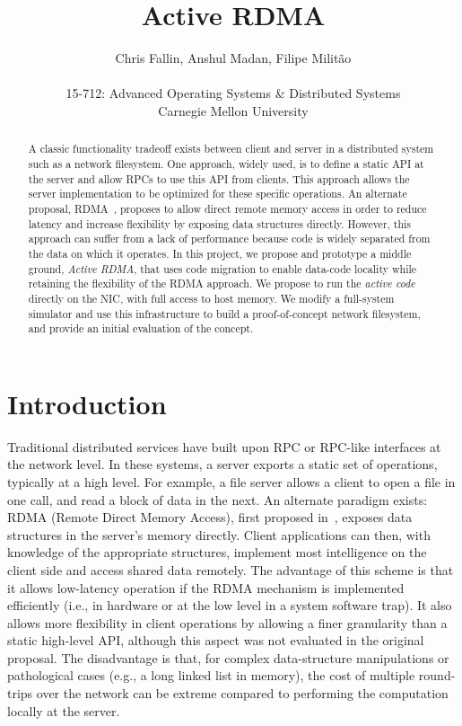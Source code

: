 \documentclass[10pt]{article}
\title{Active RDMA}
\author{Chris Fallin, Anshul Madan, Filipe Milit\~{a}o\\ \\
15-712: Advanced Operating Systems \&  Distributed Systems\\
Carnegie Mellon University}
\date{}
\begin{document}
\maketitle

\begin{abstract}
A classic functionality tradeoff exists between client and server in a
distributed system such as a network filesystem. One approach, widely
used, is to define a static API at the server and allow RPCs to use
this API from clients. This approach allows the server implementation
to be optimized for these specific operations. An alternate proposal,
RDMA~\cite{thekkath94}, proposes to allow direct remote memory access
in order to reduce latency and increase flexibility by exposing data
structures directly. However, this approach can suffer from a lack of
performance because code is widely separated from the data on which it
operates. In this project, we propose and prototype a middle ground,
\emph{Active RDMA}, that uses code migration to enable data-code
locality while retaining the flexibility of the RDMA approach. We
propose to run the \emph{active code} directly on the NIC, with full
access to host memory. We modify a full-system simulator and use this
infrastructure to build a proof-of-concept network filesystem, and
provide an initial evaluation of the concept.

\end{abstract}

\section{Introduction}

Traditional distributed services have built upon RPC or RPC-like
interfaces at the network level. In these systems, a server exports a
static set of operations, typically at a high level. For example, a
file server allows a client to open a file in one call, and read a
block of data in the next. An alternate paradigm exists: RDMA (Remote
Direct Memory Access), first proposed in~\cite{thekkath94}, exposes
data structures in the server's memory directly. Client applications
can then, with knowledge of the appropriate structures, implement most
intelligence on the client side and access shared data remotely. The
advantage of this scheme is that it allows low-latency operation if
the RDMA mechanism is implemented efficiently (i.e., in hardware or at
the low level in a system software trap). It also allows more
flexibility in client operations by allowing a finer granularity than
a static high-level API, although this aspect was not evaluated in the
original proposal. The disadvantage is that, for complex
data-structure manipulations or pathological cases (e.g., a long
linked list in memory), the cost of multiple round-trips over the
network can be extreme compared to performing the computation locally
at the server.
\end{document}
